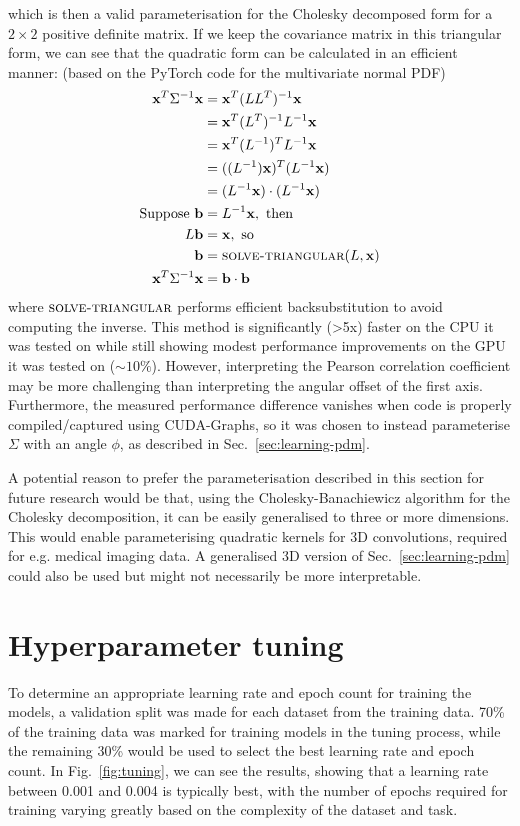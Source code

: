 \documentclass[a4paper, 12pt]{report}
\begin{document}
which is then a valid parameterisation for the Cholesky decomposed form for a $2\times 2$ positive definite matrix. If we keep the covariance matrix in this triangular form, we can see that the quadratic form can be calculated in an efficient manner:
(based on the PyTorch code for the multivariate normal PDF)
\begin{align}
	\mathbf{x}^T\Sigma^{-1}\mathbf{x}
	&= \mathbf{x}^T(LL^T)^{-1}\mathbf{x}\\
	&= \mathbf{x}^T(L^T)^{-1}L^{-1}\mathbf{x}\\
	&= \mathbf{x}^T(L^{-1})^{T}L^{-1}\mathbf{x}\\
	&= ((L^{-1})\mathbf{x})^T(L^{-1}\mathbf{x})\\
	&= (L^{-1}\mathbf{x})\cdot(L^{-1}\mathbf{x})\\
\textrm{Suppose }\mathbf{b}&=L^{-1}\mathbf{x}, \textrm{ then} \nonumber\\
	L\mathbf{b}&=\mathbf{x}, \textrm{ so}\nonumber\\
	\mathbf{b}&= \textsc{solve-triangular}(L, \mathbf{x})\\
	\mathbf{x}^T\Sigma^{-1}\mathbf{x} &= \mathbf{b}\cdot\mathbf{b}
\end{align}
where $\textsc{solve-triangular}$ performs efficient backsubstitution to avoid computing the inverse. This method is significantly (>5x) faster on the CPU it was tested on while still showing modest performance improvements on the GPU it was tested on ($\sim 10\%$). However, interpreting the Pearson correlation coefficient may be more challenging than interpreting the angular offset of the first axis. Furthermore, the measured performance difference vanishes when code is properly compiled/captured using CUDA-Graphs, so it was chosen to instead parameterise $\Sigma$ with an angle $\phi$, as described in Sec.\ \ref{sec:learning-pdm}.

A potential reason to prefer the parameterisation described in this section for future research would be that, using the Cholesky-Banachiewicz algorithm for the Cholesky decomposition, it can be easily generalised to three or more dimensions. This would enable parameterising quadratic kernels for 3D convolutions, required for e.g. medical imaging data. A generalised 3D version of Sec.\ \ref{sec:learning-pdm} could also be used but might not necessarily be more interpretable.

\newpage
\section{Hyperparameter tuning }
\label{sec:hyperparameters}
To determine an appropriate learning rate and epoch count for training the models, a validation split was made for each dataset from the training data. 70\% of the training data was marked for training models in the tuning process, while the remaining 30\% would be used to select the best learning rate and epoch count.
In Fig.\ \ref{fig:tuning}, we can see the results, showing that a learning rate between 0.001 and 0.004 is typically best, with the number of epochs required for training varying greatly based on the complexity of the dataset and task. 
\end{document}

